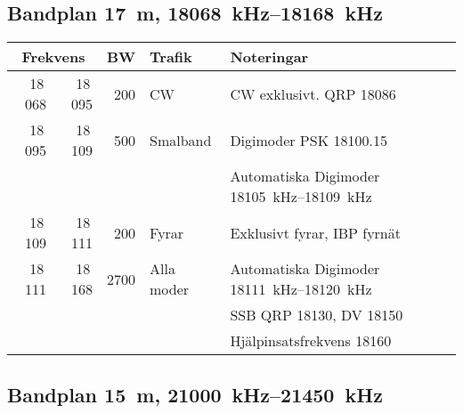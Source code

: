 \subsection{Bandplan \qty{17}{\metre}, \SIrange{18068}{18168}{\kilo\hertz}}

\begin{tabular}{rrrll}
\multicolumn{2}{c}{\textbf{Frekvens}} & \textbf{BW} & \textbf{Trafik}
        & \textbf{Noteringar} \\ \hline

18\,068  & 18\,095 & 200  & CW         & CW exklusivt. QRP \num{18086}                             \\ \hline
18\,095  & 18\,109 & 500  & Smalband   & Digimoder PSK \num{18100,15}                              \\
         &         &      &            & Automatiska Digimoder \SIrange{18105}{18109}{\kilo\hertz} \\ \hline
18\,109  & 18\,111 & 200  & Fyrar      & Exklusivt fyrar, IBP fyrnät                               \\ \hline
18\,111  & 18\,168 & 2700 & Alla moder & Automatiska Digimoder \SIrange{18111}{18120}{\kilo\hertz} \\
         &         &      &            & SSB QRP \num{18130}, DV \num{18150}                       \\
         &         &      &            & Hjälpinsatsfrekvens \num{18160}                    \\
\end{tabular}

\subsection{Bandplan \qty{15}{\metre}, \SIrange{21000}{21450}{\kilo\hertz}}

